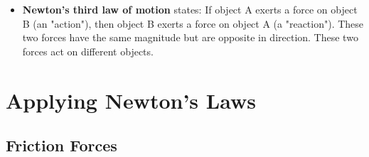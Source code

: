 \documentclass{article}
\begin{document}
\begin{itemize}
  \item \textbf{Newton's third law of motion} states: If object A exerts a force on object B (an "action"), then object B exerts a force on object A (a "reaction"). These two forces have the same magnitude but are opposite in direction. These two forces act on different objects.
\end{itemize}

\section{Applying Newton's Laws}

\setcounter{subsection}{2}
\subsection{Friction Forces}
\end{document}
